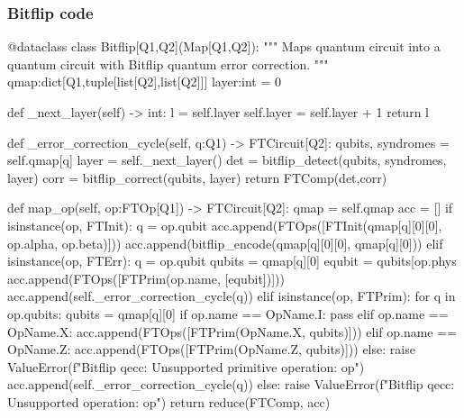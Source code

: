 \subsubsection{Bitflip code}

  \begin{comment}
    \begin{sh}
    printf '\\begin{%
    cat $PROJECT_ROOT/python/qecsurface/qeccs.py | sedlines.sh 'Bitflip'
    printf '\\end{%
    \end{sh}
  \end{comment}

  \begin{python}
  @dataclass
  class Bitflip[Q1,Q2](Map[Q1,Q2]):
    """ Maps quantum circuit into a quantum circuit with Bitflip quantum error correction. """
    qmap:dict[Q1,tuple[list[Q2],list[Q2]]]
    layer:int = 0
  
    def _next_layer(self) -> int:
      l = self.layer
      self.layer = self.layer + 1
      return l
  
    def _error_correction_cycle(self, q:Q1) -> FTCircuit[Q2]:
      qubits, syndromes = self.qmap[q]
      layer = self._next_layer()
      det = bitflip_detect(qubits, syndromes, layer)
      corr = bitflip_correct(qubits, layer)
      return FTComp(det,corr)
  
    def map_op(self, op:FTOp[Q1]) -> FTCircuit[Q2]:
      qmap = self.qmap
      acc = []
      if isinstance(op, FTInit):
        q = op.qubit
        acc.append(FTOps([FTInit(qmap[q][0][0], op.alpha, op.beta)]))
        acc.append(bitflip_encode(qmap[q][0][0], qmap[q][0]))
      elif isinstance(op, FTErr):
        q = op.qubit
        qubits = qmap[q][0]
        equbit = qubits[op.phys %
        acc.append(FTOps([FTPrim(op.name, [equbit])]))
        acc.append(self._error_correction_cycle(q))
      elif isinstance(op, FTPrim):
        for q in op.qubits:
          qubits = qmap[q][0]
          if op.name == OpName.I:
            pass
          elif op.name == OpName.X:
            acc.append(FTOps([FTPrim(OpName.X, qubits)]))
          elif op.name == OpName.Z:
            acc.append(FTOps([FTPrim(OpName.Z, qubits)]))
          else:
            raise ValueError(f"Bitflip qecc: Unsupported primitive operation: {op}")
          acc.append(self._error_correction_cycle(q))
      else:
        raise ValueError(f"Bitflip qecc: Unsupported operation: {op}")
      return reduce(FTComp, acc)
  \end{python}


